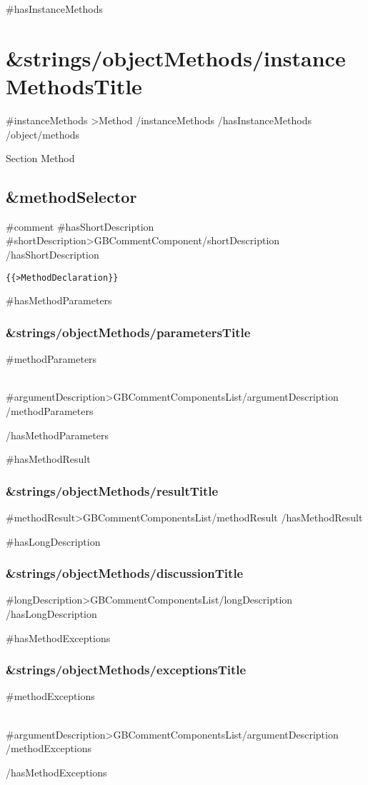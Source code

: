{{#hasInstanceMethods}}
\section{ {{&strings/objectMethods/instanceMethodsTitle}} }
\label{api/objects/{{&page/title}}/InstanceMethods}
{{#instanceMethods}}
	{{>Method}}
{{/instanceMethods}}
{{/hasInstanceMethods}}
{{/object/methods}}


Section Method
\subsection{ {{&methodSelector}} }
\label{ {{&htmlReferenceName}} }
{{#comment}}
{{#hasShortDescription}}
	{{#shortDescription}}{{>GBCommentComponent}}{{/shortDescription}}
{{/hasShortDescription}}

\begin{verbatim}
{{>MethodDeclaration}}
\end{verbatim}

{{#hasMethodParameters}}
\subsubsection{ {{&strings/objectMethods/parametersTitle}} }
\begin{description}
{{#methodParameters}}
	\item[\parameter{ {{&argumentName}} }] \hfill \\  {{#argumentDescription}}{{>GBCommentComponentsList}}{{/argumentDescription}}
{{/methodParameters}}
\end{description}
{{/hasMethodParameters}}
	
{{#hasMethodResult}}
\subsubsection{ {{&strings/objectMethods/resultTitle}} }
	{{#methodResult}}{{>GBCommentComponentsList}}{{/methodResult}}
{{/hasMethodResult}}
	
{{#hasLongDescription}}
\subsubsection{ {{&strings/objectMethods/discussionTitle}} }
	{{#longDescription}}{{>GBCommentComponentsList}}{{/longDescription}}
{{/hasLongDescription}}
	
{{#hasMethodExceptions}}
\subsubsection{ {{&strings/objectMethods/exceptionsTitle}} }
\begin{description}
{{#methodExceptions}}
	\item[\exception{ {{&argumentName}} }]\hfill \\  {{#argumentDescription}}{{>GBCommentComponentsList}}{{/argumentDescription}}
{{/methodExceptions}}
\end{description}
{{/hasMethodExceptions}}
	
